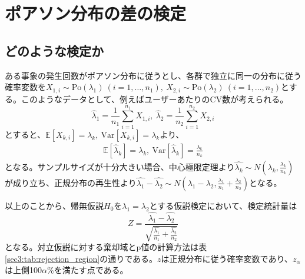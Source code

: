 \section{ポアソン分布の差の検定}

\subsection{どのような検定か}
ある事象の発生回数がポアソン分布に従うとし、各群で独立に同一の分布に従う確率変数を$X_{1, i} \sim \text{Po}(\lambda_{1})\ (i = 1, \ldots, n_{1}),\ X_{2, i} \sim \text{Po}(\lambda_{2})\ (i = 1, \ldots, n_{2})$とする。このようなデータとして、例えばユーザーあたりのCV数が考えられる。
\begin{equation}
    \hat{\lambda}_{1} = \frac{1}{n_{1}} \sum_{i = 1}^{n_{1}} X_{1, i},\ \hat{\lambda}_{2} = \frac{1}{n_{2}} \sum_{i = 1}^{n_{2}} X_{2, i}
\end{equation}
とすると、$\mathbb{E}[X_{k, i}] = \lambda_{k},\ \text{Var}[X_{k, i}] = \lambda_{k}$より、
\begin{align}
    \mathbb{E}[\hat{\lambda}_{k}] = \lambda_{k},\ \text{Var}[\hat{\lambda}_{k}] = \frac{\lambda_{k}}{n_{k}}
\end{align}
となる。サンプルサイズが十分大きい場合、中心極限定理より$\hat{\lambda_{k}} \sim N(\lambda_{k}, \frac{\lambda_{k}}{n_{k}})$が成り立ち、正規分布の再生性より$\hat{\lambda_{1}} - \hat{\lambda_{2}} \sim N(\lambda_{1} - \lambda_{2}, \frac{\lambda_{1}}{n_{1}} + \frac{\lambda_{2}}{n_{2}})$となる。

以上のことから、帰無仮説$H_{0}$を$\lambda_{1} = \lambda_{2}$とする仮説検定において、検定統計量は
\begin{equation}
    Z = \frac{\hat{\lambda_{1}} - \hat{\lambda_{2}}}{\sqrt{\frac{\hat{\lambda_{1}}}{n_{1}} + \frac{\hat{\lambda_{2}}}{n_{2}}}}
\end{equation}
となる。対立仮説に対する棄却域とp値の計算方法は表\ref{sec3:tab:rejection_region}の通りである。$z$は正規分布に従う確率変数であり、$z_{\alpha}$は上側100$\alpha$\%を満たす点である。

